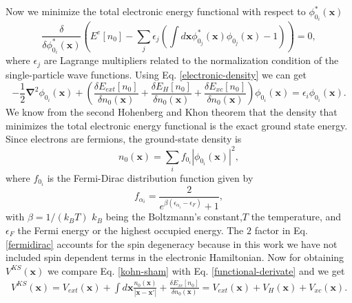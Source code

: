 Now we minimize the total electronic energy functional with respect to $\phi_{0_{i}}^{*}(\mathbf{x})$
\begin{equation}
 \frac{\delta}{\delta\phi_{0_{i}}^{*}(\mathbf{x})}\left(E^{e}[n_{0}]-\sum_{j}\epsilon_{j}(\int{d\mathbf{x}\phi_{0_{j}}^{*}(\mathbf{x})\phi_{0_{j}}(\mathbf{x})-1})\right)=0,
\end{equation}
where $\epsilon_{j}$ are Lagrange multipliers related to the normalization condition of the single-particle wave functions. Using Eq. \ref{electronic-density} we can get
\begin{equation}
\label{functional-derivate}
 -\frac{1}{2}\boldsymbol{\nabla}^{2}\phi_{0_{i}}(\mathbf{x})+\left(\frac{\delta E_{ext}[n_{0}]}{\delta n_{0}(\mathbf{x})}+\frac{\delta E_{H}[n_{0}]}{\delta n_{0}(\mathbf{x})}+\frac{
 \delta E_{xc}[n_{0}]}{\delta n_{0}(\mathbf{x})}\right)\phi_{0_{i}}(\mathbf{x})=\epsilon_{i}\phi_{0_{i}}(\mathbf{x}).
\end{equation}
We know from the second Hohenberg and Khon theorem that the density that minimizes the total electronic energy functional is the exact ground state energy. Since electrons are fermions, the ground-state density is
\begin{equation}
 \label{ground-state-density}
 n_{0}(\mathbf{x})=\sum_{i}f_{0_{i}}|\phi_{0_{i}}(\mathbf{x})|^{2},
\end{equation}
where $f_{0_{i}}$ is the Fermi-Dirac distribution function given by
\begin{equation}
 \label{fermidirac}
 f_{\alpha_{i}}=\frac{2}{e^{\beta(\epsilon_{\alpha_{i}}-\epsilon_{F})}+1},
\end{equation}
with $\beta=1/(k_{B}T)$ $k_{B}$ being the Boltzmann's constant,$T$ the temperature, and $\epsilon_{F}$ the Fermi energy or the highest occupied energy. The $2$ factor in Eq. \ref{fermidirac} accounts for the 
spin degeneracy because in this work we have not included spin dependent terms in the electronic Hamiltonian. Now for obtaining $V^{KS}(\mathbf{x})$ we compare Eq. \ref{kohn-sham} with Eq. \ref{functional-derivate} and we get
\begin{multline}
 V^{KS}(\mathbf{x})=V_{ext}(\mathbf{x})+\int{d\mathbf{x}\frac{n_{0}(\mathbf{x})}{|\mathbf{x}-\mathbf{x}'|}}+\frac{\delta E_{xc}[n_{0}]}{\delta n_{0}(\mathbf{x})}=V_{ext}(\mathbf{x})+V_{H}(\mathbf{x})+V_{xc}(\mathbf{x}).
\end{multline}
\\

